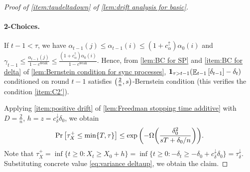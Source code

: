 \documentclass[letterpaper,11pt]{article}
\newcommand{\indicator}{\mathbf{1}}
\DeclareMathOperator*{\E}{\mathbb{E}}
\newcommand{\alphanorm}{\gamma}
\newcommand{\cweak}{c^{\mathrm{weak}}}
\newcommand{\calphaup}{c^{\uparrow}_\alpha}
\newcommand{\bounded}{D}
\newcommand{\variance}{s}
\newcommand{\taudeltadown}{\tau^{\downarrow}_\delta}
\newcommand{\cdeltadown}{c^{\downarrow}_\delta}
\newcommand{\tauidown}{\tau^{\downarrow}_i}
\newcommand{\tauxplus}{\tau_X^+}
\begin{document}
\begin{proof}[Proof of \cref{item:taudeltadown} of \cref{lem:drift analysis for basic}]

    \paragraph*{2-Choices.}
    If $ t-1 < \tau $, we have $\alpha_{t-1}(j) \le \alpha_{t-1}(i) \le (1+\calphaup)\alpha_0(i)$ and $ \alphanorm_{t-1} \leq \frac{\alpha_{t-1}(j)}{1-\cweak} \leq \frac{(1+\calphaup)\alpha_{0}(i)}{1-\cweak} $.
    Hence, from \cref{lem:BC for SP} and \cref{item:BC for delta} of \cref{lem:Bernstein condition for sync processes}, 
    $\indicator_{\tau>t-1}\qty(\E_{t-1}\qty[ \delta_{t-1}]-\delta_t)$ conditioned on round $t-1$ satisfies $\qty(\frac{2}{n},\variance)$-Bernstein condition (this verifies the condition \ref{item:C2'}).

    


   Applying \cref{item:positive drift} of \cref{lem:Freedman stopping time additive} with $\bounded = \frac 2 n $, $h=z= \cdeltadown \delta_0$, we obtain
    \begin{align*}
        \Pr\qty[\tauxplus\leq \min\{T,\tau\}]
        \leq \exp\qty(-\Omega\qty(\frac{\delta_0^2}{ \variance T+\delta_0/n})).
    \end{align*}
    Note that $\tauxplus=\inf\{t\geq 0: X_t\geq X_0+h\}=\inf\{t\geq 0: -\delta_t\geq -\delta_0+\cdeltadown \delta_0\}=\taudeltadown$.
    Substituting concrete value \cref{eq:variance deltaup}, we obtain the claim.


\end{proof}
\end{document}
